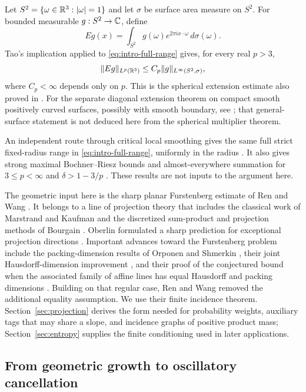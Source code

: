 Let $S^2=\{\omega\in\mathbb R^3:|\omega|=1\}$ and let $\sigma$ be surface
area measure on $S^2$. For bounded measurable $g:S^2\to\mathbb C$, define
\[
 Eg(x)=\int_{S^2}g(\omega)e^{2\pi i x\cdot\omega}\,d\sigma(\omega).
\]
Tao's implication applied to \eqref{eq:intro-full-range} gives, for
every real $p>3$,
\[
 \lVert Eg\rVert_{L^p(\mathbb R^3)}
 \le C_p\lVert g\rVert_{L^\infty(S^2,\sigma)},
\]
where $C_p<\infty$ depends only on $p$. This is the spherical extension
estimate also proved in \citet[Theorem~1.1]{OpenAISphere2026}.
For the separate diagonal extension theorem on compact smooth positively
curved surfaces, possibly with smooth boundary, see
\citet[Theorem~1.1]{OpenAIDiagonal2026}; that general-surface statement is
not deduced here from the spherical multiplier theorem.

An independent route through critical local smoothing gives the same
full strict fixed-radius range in \eqref{eq:intro-full-range}, uniformly
in the radius \citep[Corollary~11.2]{OpenAILocalSmoothing2026}.
It also gives strong maximal Bochner--Riesz bounds and almost-everywhere
summation for $3\le p<\infty$ and $\delta>1-3/p$
\citep[Theorem~11.1]{OpenAILocalSmoothing2026}.
These results are not inputs to the argument here.

The geometric input here is the sharp planar Furstenberg estimate of
Ren and Wang \citep{RenWang2025}. It belongs to a line of projection
theory that includes the classical work of Marstrand and Kaufman
\citep{Marstrand1954,Kaufman1968} and the discretized sum-product and
projection methods of Bourgain \citep{Bourgain2010}. Oberlin formulated
a sharp prediction for exceptional projection directions
\citep{Oberlin2012}. Important advances toward the Furstenberg problem
include the packing-dimension results of Orponen and Shmerkin
\citep{Orponen2020Packing,Shmerkin2022Packing}, their joint
Hausdorff-dimension improvement \citep{OrponenShmerkin2023Hausdorff},
and their proof of the conjectured bound when the associated family of
affine lines has equal Hausdorff and packing dimensions
\citep{OrponenShmerkin2026ABC}. Building on that regular case, Ren and
Wang removed the additional equality assumption. We use their finite
incidence theorem. Section~\ref{sec:projection} derives the form needed
for probability weights, auxiliary tags that may share a slope, and
incidence graphs of positive product mass; Section~\ref{sec:entropy}
supplies the finite conditioning used in later applications.

\subsection{From geometric growth to oscillatory cancellation}

